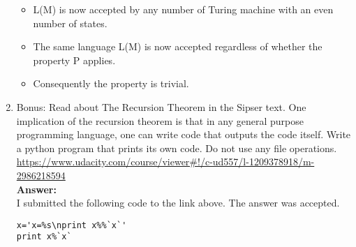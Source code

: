 \documentclass[12pt]{article}
\begin{document}
\begin{enumerate}
\begin{itemize}
	\item L(M) is now accepted by any number of Turing machine with an even number of states. 
	\item The same language L(M) is now accepted regardless of whether the property P applies.
	\item Consequently the property is trivial.
	\end{itemize}
\newpage
\item Bonus: Read about The Recursion Theorem in the Sipser text. One implication of the recursion theorem is that in any general purpose programming language, one can write code that outputs the code itself. Write a python program that prints its own code. Do not use any file operations.
\\[0.2in] \url{https://www.udacity.com/course/viewer#!/c-ud557/l-1209378918/m-2986218594}
\\[.2in]\textbf{Answer:}
\\[0.2in] I submitted the following code to the link above.  The answer was accepted.
\begin{lstlisting}
x='x=%s\nprint x%%`x`'
print x%`x`
\end{lstlisting}
\end{enumerate}
\end{document}
